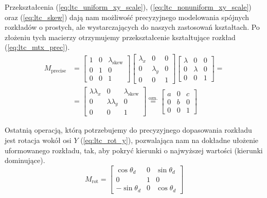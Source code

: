 \documentclass[../main.tex]{subfiles}
\begin{document}
Przekształcenia (\ref{eq:ltc_uniform_xy_scale}), (\ref{eq:ltc_nonuniform_xy_scale}) oraz (\ref{eq:ltc_skew}) dają nam możliwość precyzyjnego modelowania spójnych rozkładów o prostych, ale wystarczających do naszych zastosowań kształtach. Po złożeniu tych macierzy otrzymujemy przekształcenie kształtujące rozkład (\ref{eq:ltc_mtx_prec}).
\begin{equation}
\begin{aligned}
M_{\text{precise}} &=
\begin{bmatrix}
1 & 0 & \lambda_{\text{skew}} \\
0 & 1 & 0 \\
0 & 0 & 1
\end{bmatrix}
\begin{bmatrix}
\lambda_x & 0 & 0 \\
0 & \lambda_y & 0 \\
0 & 0 & 1
\end{bmatrix}
\begin{bmatrix}
\lambda & 0 & 0 \\
0 & \lambda & 0 \\
0 & 0 & 1
\end{bmatrix} 
=
\\
&=
\begin{bmatrix}
\lambda\lambda_x & 0 & \lambda_{\text{skew}} \\
0 & \lambda\lambda_y & 0 \\
0 & 0 & 1
\end{bmatrix}
\stackrel{\text{ozn.}}{=}
\begin{bmatrix}
a & 0 & c \\
0 & b & 0 \\
0 & 0 & 1
\end{bmatrix}
\end{aligned}
\label{eq:ltc_mtx_prec}
\end{equation}

Ostatnią operacją, którą potrzebujemy do precyzyjnego dopasowania rozkładu jest rotacja wokół osi $Y$ (\ref{eq:ltc_rot_y}), pozwalająca nam na dokładne ułożenie uformowanego rozkładu, tak, aby pokryć kierunki o najwyższej wartości (kierunki dominujące).
\begin{equation}
M_{\text{rot}} =
\begin{bmatrix}
\cos\theta_d  & 0     & \sin\theta_d \\
0           & 1     & 0 \\
-\sin\theta_d & 0     & \cos\theta_d
\end{bmatrix}
\label{eq:ltc_rot_y}
\end{equation}
\end{document}
